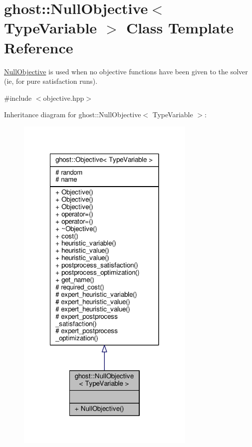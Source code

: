 \hypertarget{classghost_1_1NullObjective}{\section{ghost\-:\-:Null\-Objective$<$ Type\-Variable $>$ Class Template Reference}
\label{classghost_1_1NullObjective}
}


\hyperlink{classghost_1_1NullObjective}{Null\-Objective} is used when no objective functions have been given to the solver (ie, for pure satisfaction runs).  




{\ttfamily \#include $<$objective.\-hpp$>$}



Inheritance diagram for ghost\-:\-:Null\-Objective$<$ Type\-Variable $>$\-:\nopagebreak
\begin{figure}[H]
\begin{center}
\leavevmode
\includegraphics[width=242pt]{classghost_1_1NullObjective__inherit__graph}
\end{center}
\end{figure}


